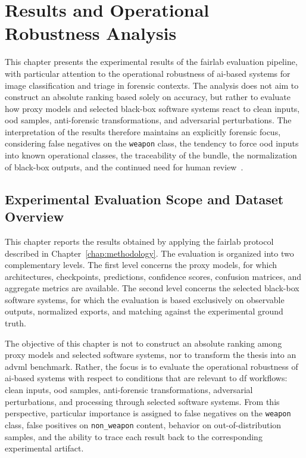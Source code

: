 \chapter{Results and Operational Robustness Analysis}
\label{chap:results}

This chapter presents the experimental results of the \gls{fairlab} evaluation
pipeline, with particular attention to the operational robustness of
\gls{ai}-based systems for image classification and triage in forensic
contexts. The analysis does not aim to construct an absolute ranking based
solely on accuracy, but rather to evaluate how proxy models and selected
black-box software systems react to clean inputs, \gls{ood} samples,
anti-forensic transformations, and adversarial perturbations. The interpretation
of the results therefore maintains an explicitly forensic focus, considering
false negatives on the \texttt{weapon} class, the tendency to force \gls{ood}
inputs into known operational classes, the traceability of the bundle, the
normalization of black-box outputs, and the continued need for human
review~\cite{costantini2019digital,sanna2024preliminary,sanna2025pixelperfect}.


\section{Experimental Evaluation Scope and Dataset Overview}
\label{sec:results-scope}

This chapter reports the results obtained by applying the \gls{fairlab}
protocol described in Chapter~\ref{chap:methodology}. The evaluation is
organized into two complementary levels. The first level concerns the proxy
models, for which architectures, checkpoints, predictions, confidence scores,
confusion matrices, and aggregate metrics are available. The second level
concerns the selected black-box software systems, for which the evaluation is
based exclusively on observable outputs, normalized exports, and matching
against the experimental ground truth.

The objective of this chapter is not to construct an absolute ranking among
proxy models and selected software systems, nor to transform the thesis into an
\gls{advml} benchmark. Rather, the focus is to evaluate the operational
robustness of \gls{ai}-based systems with respect to conditions that are
relevant to \gls{df} workflows: clean inputs, \gls{ood} samples,
anti-forensic transformations, adversarial perturbations, and processing
through selected software systems. From this perspective, particular importance
is assigned to false negatives on the \texttt{weapon} class, false positives on
\texttt{non\_weapon} content, behavior on out-of-distribution samples, and the
ability to trace each result back to the corresponding experimental artifact.


